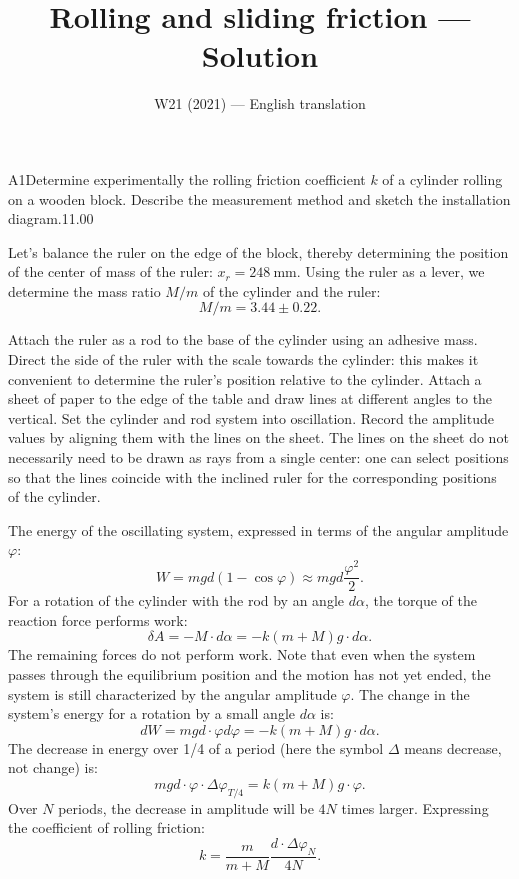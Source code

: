 \documentclass[11pt,a4paper]{article}
\title{\textbf{Rolling and sliding friction --- Solution}}
\author{\normalsize W21 (2021) — English translation}
\date{}
\begin{document}
\maketitle\vspace{-0.5em}
\begin{solcard}{A1}{Determine experimentally the rolling friction coefficient $k$ of a cylinder rolling on a wooden block. Describe the measurement method and sketch the installation diagram.}{11.00}

Let's balance the ruler on the edge of the block, thereby determining the position of the center of mass of the ruler: $x_r=248~\mathrm{mm}$. Using the ruler as a lever, we determine the mass ratio $M/m$ of the cylinder and the ruler: $$M/m=3.44 \pm 0.22.$$ 

Attach the ruler as a rod to the base of the cylinder using an adhesive mass. Direct the side of the ruler with the scale towards the cylinder: this makes it convenient to determine the ruler's position relative to the cylinder. Attach a sheet of paper to the edge of the table and draw lines at different angles to the vertical. Set the cylinder and rod system into oscillation. Record the amplitude values by aligning them with the lines on the sheet. The lines on the sheet do not necessarily need to be drawn as rays from a single center: one can select positions so that the lines coincide with the inclined ruler for the corresponding positions of the cylinder. 

The energy of the oscillating system, expressed in terms of the angular amplitude $\varphi$: $$W=mgd(1-\cos\varphi ) \approx mgd \frac{\varphi^2}{2}.$$ 
For a rotation of the cylinder with the rod by an angle $d\alpha$, the torque of the reaction force performs work: $$\delta A=-M \cdot d\alpha=-k(m+M)g \cdot d\alpha.$$ 
The remaining forces do not perform work. Note that even when the system passes through the equilibrium position and the motion has not yet ended, the system is still characterized by the angular amplitude $\varphi$. The change in the system's energy for a rotation by a small angle $d\alpha$ is: $$dW=mgd \cdot \varphi d\varphi=-k(m+M)g \cdot d\alpha.$$ 
The decrease in energy over 1/4 of a period (here the symbol $\Delta$ means decrease, not change) is: $$mgd \cdot \varphi \cdot \Delta\varphi_{T/4} = k(m+M)g \cdot \varphi.$$ 
Over $N$ periods, the decrease in amplitude will be $4N$ times larger. Expressing the coefficient of rolling friction: $$k=\frac{m}{m+M} \frac{d \cdot \Delta\varphi_N}{4N}.$$


\end{solcard}
\end{document}
